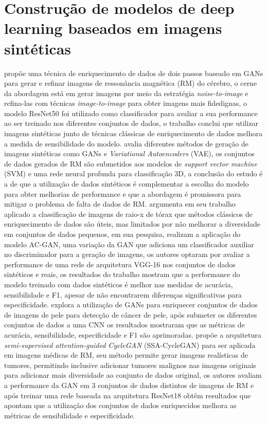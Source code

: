 \section{Construção de modelos de deep learning baseados em imagens sintéticas} \label{RevResumos}

 propõe uma técnica de enriquecimento de dados de dois passos baseado em GANs para gerar e refinar imagens de ressonância magnética (RM) do cérebro, o cerne da abordagem está em gerar imagens por meio da estratégia \textit{noise-to-image} e refina-las com técnicas \textit{image-to-image} para obter imagens mais fidedignas, o modelo ResNet50 foi utilizado como classificador para avaliar a sua performance ao ser treinado nos diferentes conjuntos de dados, o trabalho conclui que utilizar imagens sintéticas junto de técnicas clássicas de enriquecimento de dados melhora a medida de sensibilidade do modelo.
 avalia diferentes métodos de geração de imagens sintéticas como GANs e \textit{Variational Autoencoders} (VAE), os conjuntos de dados gerados de RM são submetidos aos modelos de \textit{support vector machine} (SVM) e uma rede neural profunda para classificação 3D, a conclusão do estudo é a de que a utilização de dados sintéticos é complementar a escolha do modelo para obter melhorias de performance e que a abordagem é promissora para mitigar o problema de falta de dados de RM. 
 argumenta em seu trabalho aplicado a classificação de imagens de raio-x de tórax que métodos clássicos de enriquecimento de dados são úteis, mas limitados por não melhorar a diversidade em conjuntos de dados pequenos, em sua pesquisa, realizam a aplicação do modelo AC-GAN, uma variação da GAN que adiciona um classificador auxiliar no discriminador para a geração de imagens, os autores optaram por avaliar a performance de uma rede de arquitetura VGG-16 nos conjuntos de dados sintéticos e reais, os resultados do trabalho mostram que a performance do modelo treinado com dados sintéticos é melhor nas medidas de acurácia, sensibilidade e F1, apesar de não encontrarem diferenças significativas para especificidade.
 explora a utilização de GANs para enriquecer conjuntos de dados de imagens de pele para detecção de câncer de pele, após submeter os diferentes conjuntos de dados a uma CNN os resultados mostraram que as métricas de acurácia, sensibilidade, especificidade e F1 são aprimoradas.
 propõe a arquitetura \textit{semi-supervised attention-guided CycleGAN} (SSA-CycleGAN) para ser aplicada em imagens médicas de RM, seu método permite gerar imagens realísticas de tumores, permitindo inclusive adicionar tumores malignos nas imagens originais para adicionar mais diversidade ao conjunto de dados original, os autores avaliam a performance da GAN em 3 conjuntos de dados distintos de imagens de RM e após treinar uma rede baseada na arquitetura ResNet18 obtêm resultados que apontam que a utilização dos conjuntos de dados enriquecidos melhora as métricas de sensibilidade e especificidade.

